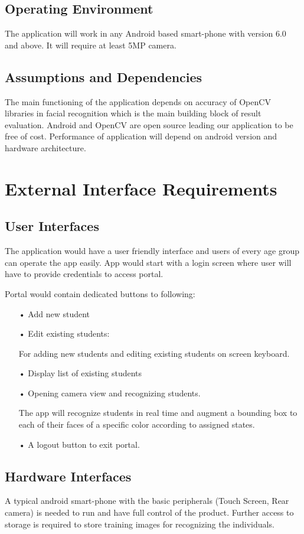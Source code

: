 \documentclass{scrreprt}
\begin{document}
\section{Operating Environment}
The application will work in any Android based smart-phone with version 6.0 and above. It will require at least 5MP camera.

\section{Assumptions and Dependencies}

The main functioning of the application depends on accuracy of OpenCV libraries in facial recognition which is the main building block of result evaluation. Android and OpenCV are open source leading our application to be free of cost. Performance of application will depend on android version and hardware architecture.


\chapter{External Interface Requirements}

\section{User Interfaces}
The application would have a user friendly interface and users of every age group can operate the app easily.
App would start with a login screen where user will have to provide credentials to access portal.

Portal would contain dedicated buttons to following:
\begin{itemize}
\item[•] Add new student
\item[•] Edit existing students:

\quad For adding new students and editing existing students on screen keyboard.

\item[•] Display list of existing students
\item[•] Opening camera view and recognizing students.

\quad The app will recognize students in real time and augment a bounding box to each of their faces of a specific color according to assigned states.
\item[•] A logout button to exit portal.
\end{itemize}

\section{Hardware Interfaces}
A typical android smart-phone with the basic peripherals (Touch Screen, Rear camera) is needed to run and have full control of the product. Further access to storage is required to store training images for recognizing the individuals.
\end{document}
